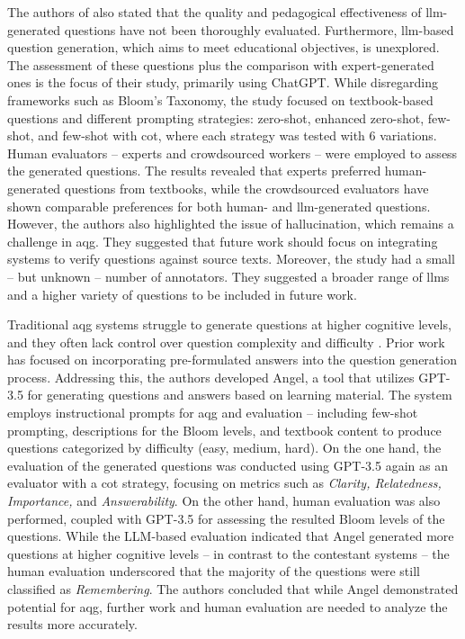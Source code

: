 The authors of \cite{al_faraby_analysis_2024} also stated that the quality and pedagogical effectiveness of \ac{llm}-generated questions have not been thoroughly evaluated. Furthermore, \ac{llm}-based question generation, which aims to meet educational objectives, is unexplored. The assessment of these questions plus the comparison with expert-generated ones is the focus of their study, primarily using ChatGPT. While disregarding frameworks such as Bloom's Taxonomy, the study focused on textbook-based questions and different prompting strategies: zero-shot, enhanced zero-shot, few-shot, and few-shot with \ac{cot}, where each strategy was tested with 6 variations. Human evaluators -- experts and crowdsourced workers -- were employed to assess the generated questions. The results revealed that experts preferred human-generated questions from textbooks, while the crowdsourced evaluators have shown comparable preferences for both human- and \ac{llm}-generated questions. However, the authors also highlighted the issue of hallucination, which remains a challenge in \ac{aqg}. They suggested that future work should focus on integrating systems to verify questions against source texts. Moreover, the study had a small -- but unknown -- number of annotators. They suggested a broader range of \acp{llm} and a higher variety of questions to be included in future work.

Traditional \ac{aqg} systems struggle to generate questions at higher cognitive levels, and they often lack control over question complexity and difficulty \cite{blobstein_angel_2023}. Prior work has focused on incorporating pre-formulated answers into the question generation process. Addressing this, the authors developed Angel, a tool that utilizes GPT-3.5 for generating questions and answers based on learning material. The system employs instructional prompts for \ac{aqg} and evaluation -- including few-shot prompting, descriptions for the Bloom levels, and textbook content to produce questions categorized by difficulty (easy, medium, hard). On the one hand, the evaluation of the generated questions was conducted using GPT-3.5 again as an evaluator with a \ac{cot} strategy, focusing on metrics such as \textit{Clarity, Relatedness, Importance,} and \textit{Answerability}. On the other hand, human evaluation was also performed, coupled with GPT-3.5 for assessing the resulted Bloom levels of the questions. While the LLM-based evaluation indicated that Angel generated more questions at higher cognitive levels -- in contrast to the contestant systems -- the human evaluation underscored that the majority of the questions were still classified as \textit{Remembering}. The authors concluded that while Angel demonstrated potential for \ac{aqg}, further work and human evaluation are needed to analyze the results more accurately.

